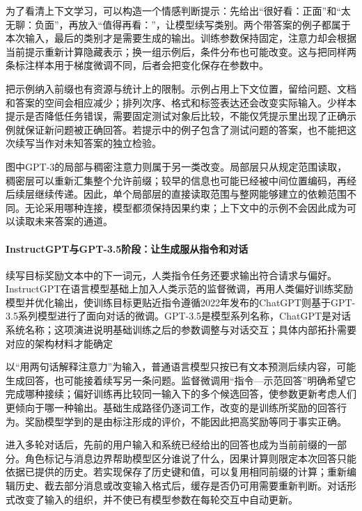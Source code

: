 为了看清上下文学习，可以构造一个情感判断提示：先给出“很好看：正面”和“太无聊：负面”，再放入“值得再看：”，让模型续写类别。两个带答案的例子都属于本次输入，最后的类别才是需要生成的输出。训练参数保持固定，注意力却会根据当前提示重新计算隐藏表示；换一组示例后，条件分布也可能改变。这与把同样两条标注样本用于梯度微调不同，后者会把变化保存在参数中。

把示例纳入前缀也有资源与统计上的限制。示例占用上下文位置，留给问题、文档和答案的空间会相应减少；排列次序、格式和标签表达还会改变实际输入。少样本提示是否降低任务错误，需要固定测试对象后比较，不能仅凭提示里出现了正确示例就保证新问题被正确回答。若提示中的例子包含了测试问题的答案，也不能把这次续写当作对未知答案的独立检验。

图中GPT-3的局部与稠密注意力则属于另一类改变。局部层只从规定范围读取，稠密层可以重新汇集整个允许前缀；较早的信息也可能已经被中间位置编码，再经后续层继续传递。因此，单个局部层的直接读取范围与整网能够建立的依赖范围不同。无论采用哪种连接，模型都须保持因果约束；上下文中的示例不会因此成为可以读取未来答案的通道。

\paragraph{InstructGPT与GPT-3.5阶段：让生成服从指令和对话}

续写目标奖励文本中的下一词元，人类指令任务还要求输出符合请求与偏好。InstructGPT在语言模型基础上加入人类示范的监督微调，再用人类偏好训练奖励模型并优化输出，使训练目标更贴近指令遵循2022年发布的ChatGPT则基于GPT-3.5系列模型进行了面向对话的微调。GPT-3.5是模型系列名称，ChatGPT是对话系统名称；这项演进说明基础训练之后的参数调整与对话交互；具体内部拓扑需要对应的架构材料才能确定

以“用两句话解释注意力”为输入，普通语言模型只按已有文本预测后续内容，可能生成回答，也可能接着续写另一条问题。监督微调用“指令—示范回答”明确希望它完成哪种接续；偏好训练再比较同一输入下的多个候选回答，使参数更新考虑人们更倾向于哪一种输出。基础生成路径仍逐词工作，改变的是训练所奖励的回答行为。奖励模型学到的是由标注形成的评价，不能因此把高奖励等同于事实正确。

进入多轮对话后，先前的用户输入和系统已经给出的回答也成为当前前缀的一部分。角色标记与消息边界帮助模型区分谁说了什么，因果计算则限定本次回答只能依据已提供的历史。若实现保存了历史键和值，可以复用相同前缀的计算；重新编辑历史、截去部分消息或改变输入格式后，缓存是否仍可用需要重新判断。对话形式改变了输入的组织，并不使已有模型参数在每轮交互中自动更新。

